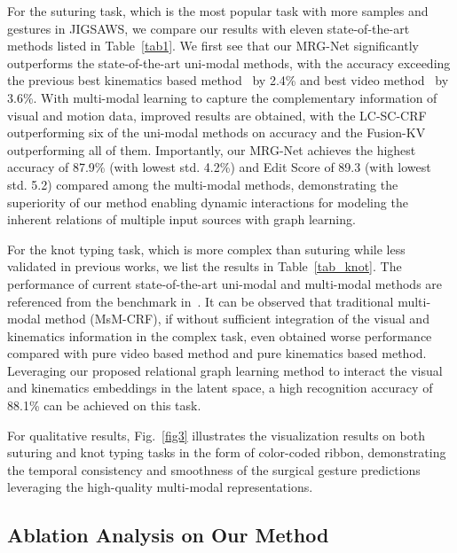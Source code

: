 \documentclass[letterpaper, 10 pt, conference]{ieeeconf}
\begin{document}
For the suturing task, which is the most popular task with more samples and gestures in JIGSAWS, we compare our results with eleven state-of-the-art methods listed in Table~\ref{tab1}.
We first see that our MRG-Net significantly outperforms the state-of-the-art uni-modal methods, with the accuracy exceeding the previous best kinematics based method~\cite{van2020multi} by 2.4\% and best video method~\cite{funke2019using} by 3.6\%. With multi-modal learning to capture the complementary information of visual and motion data, improved results are obtained, with the LC-SC-CRF~\cite{lea2016learning} outperforming six of the uni-modal methods on accuracy and the Fusion-KV~\cite{qin2020temporal} outperforming all of them. Importantly, our MRG-Net achieves the highest accuracy of 87.9\% (with lowest std. 4.2\%) and Edit Score of 89.3 (with lowest std. 5.2) compared among the multi-modal methods, demonstrating the superiority of our method enabling dynamic interactions for modeling the inherent relations of multiple input sources with graph learning.

For the knot typing task, which is more complex than suturing while less validated in previous works, we list the results in Table~\ref{tab_knot}. The performance of current state-of-the-art uni-modal and multi-modal methods are referenced from the benchmark in~\cite{ahmidi2017dataset}.
It can be observed that traditional multi-modal method (MsM-CRF),
if without sufficient integration of the visual and kinematics information in the complex task,
even obtained worse performance compared with pure video based method and pure kinematics based method.
Leveraging our proposed relational graph learning method to interact the visual and kinematics embeddings in the latent space, a high recognition accuracy of 88.1\% can be achieved on this task.

For qualitative results, Fig.~\ref{fig3} illustrates the visualization results on both suturing and knot typing tasks in the form of color-coded ribbon, demonstrating the temporal consistency and smoothness of the surgical gesture predictions leveraging the high-quality multi-modal representations.



\subsection{Ablation Analysis on Our Method}
\end{document}
